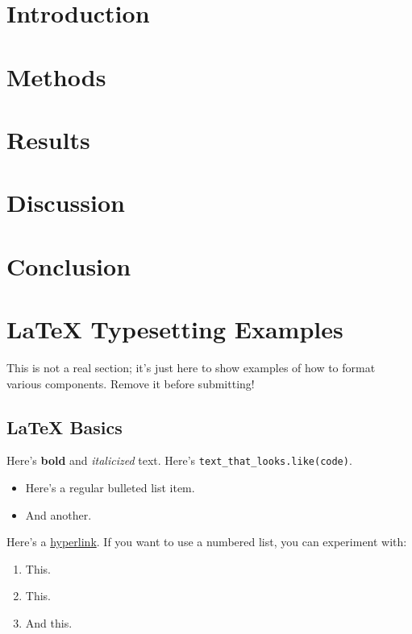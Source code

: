 \documentclass[12pt,letterpaper]{article}
\begin{document}
\maketoc
\clearpage


\section{Introduction}

\section{Methods}

\section{Results}

\section{Discussion}

\section{Conclusion}

\section{\LaTeX{} Typesetting Examples}

 {\color{blue} This is not a real section; it's just here to show examples of how to format various components. Remove it before submitting!}

\subsection{\LaTeX{} Basics}

Here's \textbf{bold} and \textit{italicized} text. Here's \texttt{text\_that\_looks.like(code)}.

\begin{itemize}
    \item Here's a regular bulleted list item.
    \item And another.
\end{itemize}

Here's a \href{https://datascience.ucsd.edu}{hyperlink}. If you want to use a numbered list, you can experiment with:

\begin{enumerate}
    \item This.
    \item This.
    \item And this.
\end{enumerate}
\end{document}
